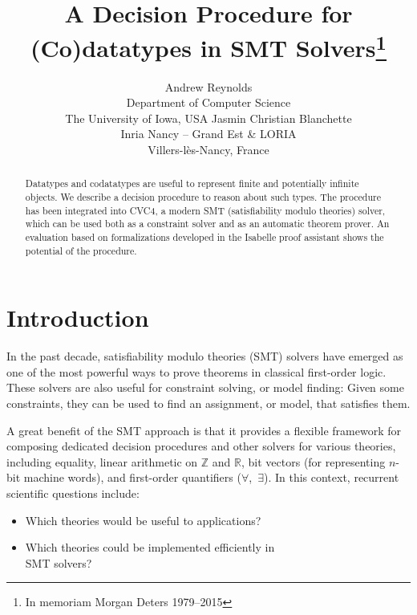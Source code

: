 \documentclass[letter]{article}
\theoremstyle{plain}
\theoremstyle{definition}
\begin{document}
\title{A Decision Procedure for (Co)datatypes in SMT Solvers\thanks{In memoriam Morgan Deters 1979--2015}}

\author {Andrew Reynolds \\
Department of Computer Science \\
The University of Iowa, USA
\And
Jasmin Christian Blanchette \\
Inria Nancy -- Grand Est \& LORIA \\
Villers-l\`es-Nancy, France
}



\maketitle

\begin{abstract}
Datatypes and codatatypes are useful to represent finite and potentially
infinite objects. We describe a decision procedure
to reason about such types. The procedure has been
integrated into CVC4, a modern SMT (satisfiability modulo theories)
solver, which can be used both as a constraint solver and as an
automatic theorem prover. An evaluation based on formalizations developed
in the Isabelle proof assistant shows the potential of the
procedure.
\end{abstract}

\section{Introduction}
\label{sec:introduction}

In the past decade, satisfiability modulo theories (SMT) solvers
\cite{nieuwenhuis-et-al-2006}
have emerged as one of the most powerful ways to prove theorems in classical
first-order logic. These solvers are also useful for constraint solving, or model finding:
Given some constraints, they can be used to find an assignment, or model, that
satisfies them.

A great benefit of the SMT approach is that it provides a flexible framework
for composing dedicated decision procedures and other solvers for various
theories, including equality, linear arithmetic on $\mathbb{Z}$ and
$\mathbb{R}$, bit vectors (for representing $n$-bit machine words),
and first-order quantifiers ($\forall$,~$\exists$). In this
context, recurrent scientific questions include:
\begin{itemize}
\item Which theories would be useful to applications?
\item Which theories could be implemented efficiently in \\ %
SMT solvers?
\end{itemize}
\end{document}
